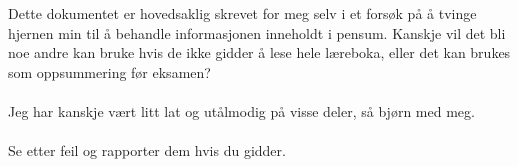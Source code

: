 Dette dokumentet er hovedsaklig skrevet for meg selv i et forsøk på å tvinge hjernen min til å behandle informasjonen inneholdt i pensum.
Kanskje vil det bli noe andre kan bruke hvis de ikke gidder å lese hele læreboka, eller det kan brukes som oppsummering før eksamen?
\\\\
Jeg har kanskje vært litt lat og utålmodig på visse deler, så bjørn med meg.
\\\\
Se etter feil og rapporter dem hvis du gidder.
